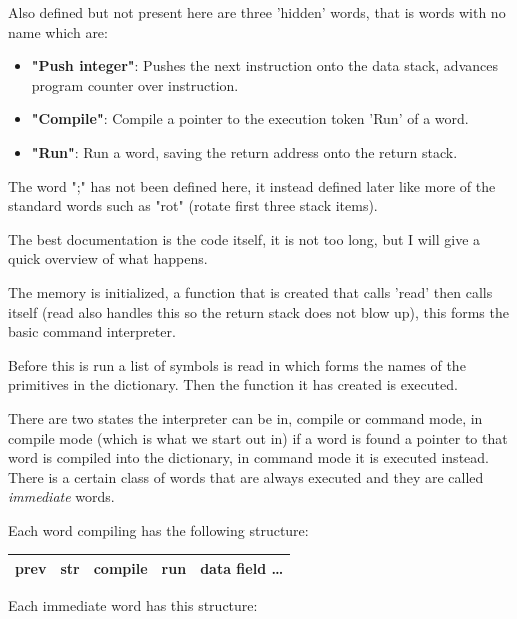 \documentclass	[a4paper, 10pt]	{article}
\begin{document}
      Also defined but not present here are three 'hidden' words, that is
      words with no name which are:

      \begin{itemize}
        \item \textbf{"Push integer"}: Pushes the next instruction onto the
        data stack, advances program counter over instruction.
        \item \textbf{"Compile"}: Compile a pointer to the execution token
        'Run' of a word.
        \item \textbf{"Run"}: Run a word, saving the return address onto the
        return stack.
      \end{itemize}

      The word ";" has not been defined here, it instead defined later like
      more of the standard words such as "rot" (rotate first three stack
      items). 

      The best documentation is the code itself, it is not too long, but
      I will give a quick overview of what happens.

      The memory is initialized, a function that is created that calls
      'read' then calls itself (read also handles this so the return stack does
      not blow up), this forms the basic command interpreter.

      Before this is run a list of symbols is read in which forms the
      names of the primitives in the dictionary. Then the function it has created
      is executed.

      There are two states the interpreter can be in, compile or command
      mode, in compile mode (which is what we start out in) if a word is
      found a pointer to that word is compiled into the dictionary, in
      command mode it is executed instead. There is a certain class of
      words that are always executed and they are called \emph{immediate}
      words.

      Each word compiling has the following structure:

      \begin{center}
        \begin{tabular}{l | c | c | c | r }
          \hline
          prev & str & \textbf{compile} & run & data field \ldots \\
          \hline
        \end{tabular}
      \end{center}

      Each immediate word has this structure:
      
\end{document}
